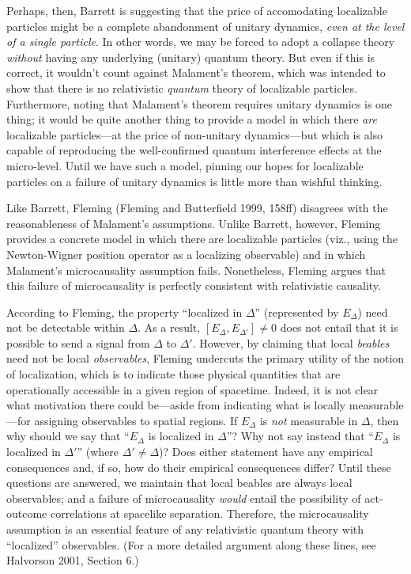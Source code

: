\documentclass[11pt]{article}
\theoremstyle{remark}
\begin{document}
Perhaps, then, Barrett is suggesting that the price of accomodating
localizable particles might be a complete abandonment of unitary
dynamics, \emph{even at the level of a single particle}.  In other
words, we may be forced to adopt a collapse theory \emph{without}
having any underlying (unitary) quantum theory.  But even if this is
correct, it wouldn't count against Malament's theorem, which was
intended to show that there is no relativistic \emph{quantum} theory
of localizable particles.  Furthermore, noting that Malament's theorem
requires unitary dynamics is one thing; it would be quite another
thing to provide a model in which there \emph{are} localizable
particles---at the price of non-unitary dynamics---but which is also
capable of reproducing the well-confirmed quantum interference effects
at the micro-level.  Until we have such a model, pinning our hopes for
localizable particles on a failure of unitary dynamics is little more
than wishful thinking.

Like Barrett, Fleming (Fleming and Butterfield 1999, 158ff) disagrees
with the reasonableness of Malament's assumptions.  Unlike Barrett,
however, Fleming provides a concrete model in which there are
localizable particles (viz., using the Newton-Wigner position operator
as a localizing observable) and in which Malament's microcausality
assumption fails.  Nonetheless, Fleming argues that this failure of
microcausality is perfectly consistent with relativistic causality.

According to Fleming, the property ``localized in $\Delta$''
(represented by $E_{\Delta}$) need not be detectable within $\Delta$.
As a result, $[E_{\Delta},E_{\Delta '}]\neq 0$ does not entail that it
is possible to send a signal from $\Delta$ to $\Delta '$.  However, by
claiming that local \emph{beables} need not be local
\emph{observables}, Fleming undercuts the primary utility of the
notion of localization, which is to indicate those physical quantities
that are operationally accessible in a given region of spacetime.
Indeed, it is not clear what motivation there could be---aside from
indicating what is locally measurable---for assigning observables to
spatial regions.  If $E_{\Delta}$ is \emph{not} measurable in
$\Delta$, then why should we say that ``$E_{\Delta}$ is localized in
$\Delta$''?  Why not say instead that ``$E_{\Delta}$ is localized in
$\Delta '$'' (where $\Delta '\neq \Delta$)?  Does either statement
have any empirical consequences and, if so, how do their empirical
consequences differ?  Until these questions are answered, we maintain
that local beables are always local observables; and a failure of
microcausality \emph{would} entail the possibility of act-outcome
correlations at spacelike separation.  Therefore, the microcausality
assumption is an essential feature of any relativistic quantum theory
with ``localized'' observables.  (For a more detailed argument along
these lines, see Halvorson 2001, Section 6.)
\end{document}
